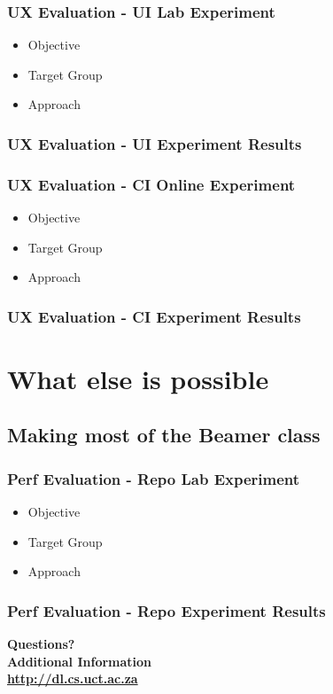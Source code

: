 \documentclass[xcolor=pdftex,t,11pt]{beamer}
\begin{document}
\begin{frame}[fragile]
\frametitle{UX Evaluation - UI Lab Experiment}
\begin{itemize}
\item Objective
\item Target Group
\item Approach
\end{itemize}
\end{frame}


\begin{frame}[fragile]
\frametitle{UX Evaluation - UI Experiment Results}
\centering

\end{frame}

\begin{frame}[fragile]
\frametitle{UX Evaluation - CI Online Experiment}
\begin{itemize}
\item Objective
\item Target Group
\item Approach
\end{itemize}
\end{frame}


\begin{frame}[fragile]
\frametitle{UX Evaluation - CI Experiment Results}
\centering

\end{frame}


\section{What else is possible}


\subsection{Making most of the Beamer class}

\begin{frame}[fragile]
\frametitle{Perf Evaluation - Repo Lab Experiment}
\begin{itemize}
\item Objective
\item Target Group
\item Approach
\end{itemize}
\end{frame}


\begin{frame}[fragile]
\frametitle{Perf Evaluation - Repo Experiment Results}
\centering

\end{frame}

\begin{frame}[fragile]
\begin{center}
\bigskip
\textbf{\fontsize{18}{18}\selectfont Questions?} \\
\textbf{\fontsize{18}{18}\selectfont Additional Information} \\
\bigskip
\textbf{\fontsize{18}{18}\selectfont \url{http://dl.cs.uct.ac.za}}
\end{center}
\end{frame}
\end{document}
